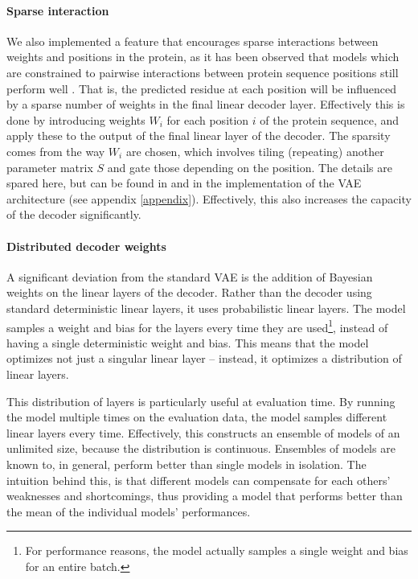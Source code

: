 \paragraph{Sparse interaction} We also implemented a feature that encourages sparse interactions between weights and positions in the protein, as it has been observed that models which are constrained to pairwise interactions between protein sequence positions still perform well \cite{hopf2017mutation}. That is, the predicted residue at each position will be influenced by a sparse number of weights in the final linear decoder layer. Effectively this is done by introducing  weights $W_i$ for each position $i$ of the protein sequence, and apply these to the output of the final linear layer of the decoder. The sparsity comes from the way $W_i$ are chosen, which involves tiling (repeating) another parameter matrix $S$ and gate those depending on the position. The details are spared here, but can be found in \textcite[methods section]{riesselman2018deep} and in the implementation of the VAE architecture (see appendix \ref{appendix}). Effectively, this also increases the capacity of the decoder significantly.

\paragraph{Distributed decoder weights} A significant deviation from the standard VAE is the addition of Bayesian weights on the linear layers of the decoder. Rather than the decoder using standard deterministic linear layers, it uses probabilistic linear layers. The model samples a weight and bias for the layers every time they are used\footnote{For performance reasons, the model actually samples a single weight and bias for an entire batch.}, instead of having a single deterministic weight and bias. This means that the model optimizes not just a singular linear layer -- instead, it optimizes a distribution of linear layers.

This distribution of layers is particularly useful at evaluation time. By running the model multiple times on the evaluation data, the model samples different linear layers every time. Effectively, this constructs an ensemble of models of an unlimited size, because the distribution is continuous. Ensembles of models are known to, in general, perform better than single models in isolation. The intuition behind this, is that different models can compensate for each others' weaknesses and shortcomings, thus providing a model that performs better than the mean of the individual models' performances.



